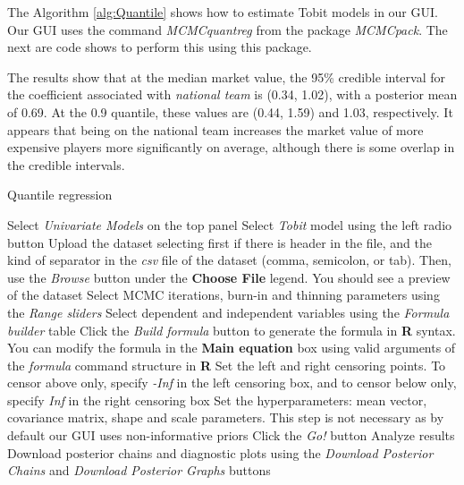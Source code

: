 The Algorithm \ref{alg:Quantile} shows how to estimate Tobit models in our GUI. Our GUI uses the command \textit{MCMCquantreg} from the package \textit{MCMCpack}. The next are code shows to perform this using this package.

The results show that at the median market value, the 95\% credible interval for the coefficient associated with \textit{national team} is (0.34, 1.02), with a posterior mean of 0.69. At the 0.9 quantile, these values are (0.44, 1.59) and 1.03, respectively. It appears that being on the national team increases the market value of more expensive players more significantly on average, although there is some overlap in the credible intervals.

\begin{algorithm}[h!]
	\caption{Quantile regression}\label{alg:Quantile}
	\begin{algorithmic}[1]  		 			
		\State Select \textit{Univariate Models} on the top panel
		\State Select \textit{Tobit} model using the left radio button
		\State Upload the dataset selecting first if there is header in the file, and the kind of separator in the \textit{csv} file of the dataset (comma, semicolon, or tab). Then, use the \textit{Browse} button under the \textbf{Choose File} legend. You should see a preview of the dataset
		\State Select MCMC iterations, burn-in and thinning parameters using the \textit{Range sliders}
		\State Select dependent and independent variables using the \textit{Formula builder} table
		\State Click the \textit{Build formula} button to generate the formula in \textbf{R} syntax. You can modify the formula in the \textbf{Main equation} box using valid arguments of the \textit{formula} command structure in \textbf{R}
		\State Set the left and right censoring points. To censor above only, specify \textit{-Inf} in the left censoring box, and to censor below only, specify \textit{Inf} in the right censoring box
		\State Set the hyperparameters: mean vector, covariance matrix, shape and scale parameters. This step is not necessary as by default our GUI uses non-informative priors
		\State Click the \textit{Go!} button
		\State Analyze results
		\State Download posterior chains and diagnostic plots using the \textit{Download Posterior Chains} and \textit{Download Posterior Graphs} buttons
	\end{algorithmic} 
\end{algorithm}

